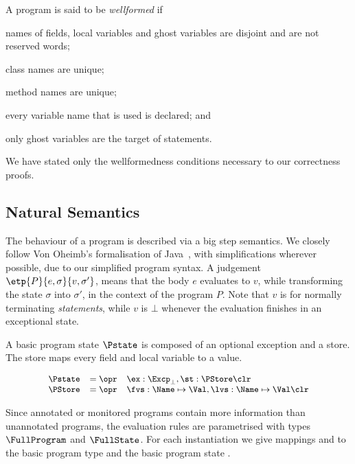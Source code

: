 A program is said to be \emph{wellformed} if
\begin{inparaenum}
\item names of fields, local variables and ghost variables are
disjoint and are not reserved words;
\item class names are unique;
\item method names are unique;
\item every variable name that is used is declared; and
\item only ghost variables are the target of \Set statements.
\end{inparaenum}
We have stated only the wellformedness conditions necessary to our
correctness proofs.

\subsection{Natural Semantics}\label{SecSemantics}
The behaviour of a program is described via a big step semantics. We
closely follow Von Oheimb's formalisation of Java~\cite{Oheimb01},
with simplifications wherever possible, due to our simplified
program syntax. A judgement $\etp{P}{e,\sigma}{v,\sigma'}$, means that the body
$e$ evaluates to $v$, while transforming the state $\sigma$ into $\sigma'$, in
the context of the program \(P\). Note that \(v\) is \One for
normally terminating \emph{statements}, while \(v\) is \(\bot\) whenever
the evaluation finishes in an exceptional state.

A basic program state \(\Pstate\) is composed of an optional exception
and a store.  The store maps every field and local variable to a
value.

\[
{\small
\begin{array}{rcl}
\Pstate & = \opr & \ex : \Excp_{\bot}, \st : \PStore \clr\\
\PStore & = \opr & \fvs : \Name \mapsto \Val, \lvs : \Name \mapsto \Val \clr
\end{array}}
\]


Since annotated or monitored programs
contain more information than unannotated programs, the
evaluation rules are parametrised with types
\(\FullProgram\) and \(\FullState\). For each instantiation we give
mappings \program and \progstate to the basic program type \Program
and the basic program state \Pstate.

